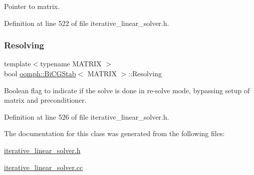 Pointer to matrix. 



Definition at line 522 of file iterative\+\_\+linear\+\_\+solver.\+h.

\mbox{\label{classoomph_1_1BiCGStab_aa50a58f59ddf74c0c902dd7769b11498}} 
\subsubsection{\texorpdfstring{Resolving}{Resolving}}
{\footnotesize\ttfamily template$<$typename M\+A\+T\+R\+IX $>$ \\
bool \hyperlink{classoomph_1_1BiCGStab}{oomph\+::\+Bi\+C\+G\+Stab}$<$ M\+A\+T\+R\+IX $>$\+::Resolving\hspace{0.3cm}{\ttfamily [private]}}



Boolean flag to indicate if the solve is done in re-\/solve mode, bypassing setup of matrix and preconditioner. 



Definition at line 526 of file iterative\+\_\+linear\+\_\+solver.\+h.



The documentation for this class was generated from the following files\+:\begin{DoxyCompactItemize}
\item 
\hyperlink{iterative__linear__solver_8h}{iterative\+\_\+linear\+\_\+solver.\+h}\item 
\hyperlink{iterative__linear__solver_8cc}{iterative\+\_\+linear\+\_\+solver.\+cc}\end{DoxyCompactItemize}
